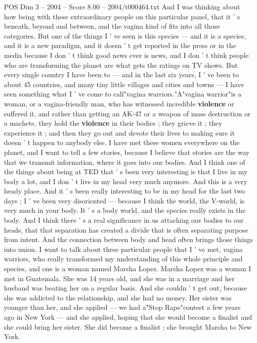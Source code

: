 \begin{textsample}{POS Dim 3 – 2004 – Score 8.00 – 2004/t000464.txt}
And I was thinking about how being with these extraordinary people on this particular panel, that it ' s beneath, beyond and between, and the vagina kind of fits into all those categories.
But one of the things I ' ve seen is this species — and it is a species, and it is a new paradigm, and it doesn ' t get reported in the press or in the media because I don ' t think good news ever is news, and I don ' t think people who are transforming the planet are what gets the ratings on TV shows.
But every single country I have been to — and in the last six years, I ' ve been to about 45 countries, and many tiny little villages and cities and towns — I have seen something what I ' ve come to call"vagina warriors."A"vagina warrior"is a woman, or a vagina-friendly man, who has witnessed incredible \textbf{violence} or suffered it, and rather than getting an AK-47 or a weapon of mass destruction or a machete, they hold the \textbf{violence} in their bodies ; they grieve it ; they experience it ; and then they go out and devote their lives to making sure it doesn ' t happen to anybody else.
I have met these women everywhere on the planet, and I want to tell a few stories, because I believe that stories are the way that we transmit information, where it goes into our bodies.
And I think one of the things about being at TED that ' s been very interesting is that I live in my body a lot, and I don ' t live in my head very much anymore.
And this is a very heady place.
And it ' s been really interesting to be in my head for the last two days ; I ' ve been very disoriented — because I think the world, the V-world, is very much in your body.
It ' s a body world, and the species really exists in the body.
And I think there ' s a real significance in us attaching our bodies to our heads, that that separation has created a divide that is often separating purpose from intent.
And the connection between body and head often brings those things into union.
I want to talk about three particular people that I ' ve met, vagina warriors, who really transformed my understanding of this whole principle and species, and one is a woman named Marsha Lopez.
Marsha Lopez was a woman I met in Guatemala.
She was 14 years old, and she was in a marriage and her husband was beating her on a regular basis.
And she couldn ' t get out, because she was addicted to the relationship, and she had no money.
Her sister was younger than her, and she applied — we had a"Stop Rape"contest a few years ago in New York — and she applied, hoping that she would become a finalist and she could bring her sister.
She did become a finalist ; she brought Marsha to New York.

\end{textsample}
